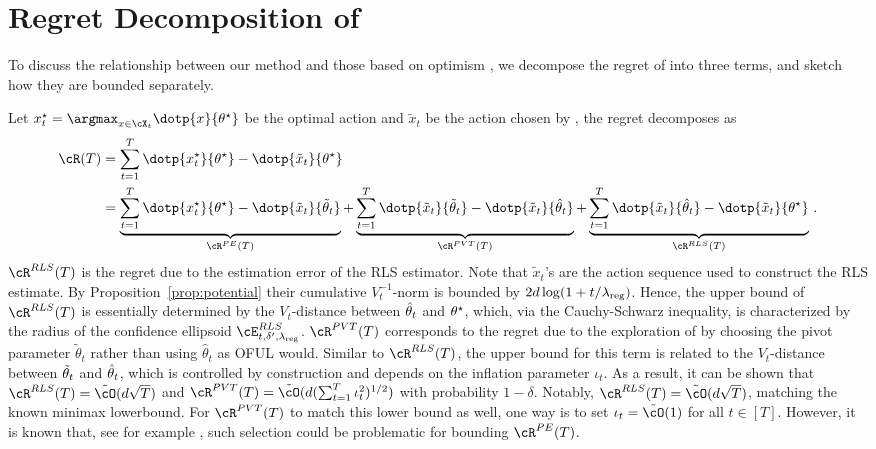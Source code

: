 



\section{Regret Decomposition of \POFUL{}}
\label{sec:regret_decomp}
To discuss the relationship between our method and those based on optimism \citep{abbasi2011improved,agrawal2013thompson,abeille2017linear}, we decompose the regret of \POFUL{} into three terms,  and sketch how they are bounded separately. 

Let  $x_t^\star = \argmax_{x\in \cX_t} \dotp{x}{\theta^\star}$ be the optimal action and $\tilde{x}_t$ be the action chosen by \POFUL{}, the regret decomposes as
%
\begin{align*}
\cR(T) & =\sum_{t=1}^T\dotp{x_t^\star}{ \theta^{\star}}-\dotp{\tilde{x}_t}{\theta^{\star}}\\
%
& = \underbrace{\sum_{t=1}^T\dotp{x_t^\star}{ \theta^{\star}}-\dotp{\tilde{x}_t}{\tilde{\theta}_t}}_{ \cR^{\PE}(T)}+ \underbrace{\sum_{t=1}^T\dotp{\tilde{x}_t}{\tilde{\theta}_t}-\dotp{\tilde{x}_t}{ \hparam_t}}_{\cR^{\PVT}(T)} +  \underbrace{\sum_{t=1}^T\dotp{\tilde{x}_t}{\hparam_t}-\dotp{\tilde{x}_t}{ \theta^{\star}}}_{\cR^{\RLS}(T)}\,.
\end{align*}
%
$\cR^{RLS}(T)$ is the regret due to the estimation error of the RLS estimator. Note that $\tilde{x}_t$'s are the action sequence used to construct the RLS estimate. By Proposition~\ref{prop:potential} their cumulative $V_t^{-1}$-norm is bounded by $2d\log(1+t/\lambda_{\text{reg}})$. Hence, the upper bound of $\cR^{RLS}(T)$ is essentially determined by the $V_t$-distance between $\hat{\theta}_t$ and $\theta^\star$, which, via the Cauchy-Schwarz inequality, is characterized by the radius of the confidence ellipsoid $\cE^{RLS}_{t,\delta^\prime, \lambdareg}$. $\cR^{\PVT}(T)$ corresponds to the regret due to the exploration of \POFUL{} by choosing the pivot parameter $\tilde{\theta}_t$ rather than using $\hat\theta_t$ as OFUL would. Similar to  $\cR^{RLS}(T)$, the upper bound for this term is related to the $V_t$-distance between $\tilde{\theta}_t$ and $\hat{\theta}_t$, which is controlled by construction and depends on the inflation parameter $\iota_t$. As a result, it can be shown that 
$\cR^{RLS}(T)  = \tilde{\cO}(d\sqrt{T}) $ and $\cR^{\PVT}(T)  = \tilde{\cO}(d(\sum_{t = 1}^T \iota_{t}^2)^{1/2}) $ with probability $1-\delta$.  Notably, $\cR^{RLS}(T) = \tilde{\cO}(d\sqrt{T})  $, matching the known minimax lowerbound. For $\cR^{\PVT}(T)$ to match this lower bound as well, one way is to set $\iota_{t}=
\tilde{\cO}(1)$ for all $t\in[T]$. However, it is known that, see for example \citep{agrawal2013thompson,abeille2017linear,hamidi2020frequentist}, such selection could be problematic for bounding $\cR^{PE}(T)$.


